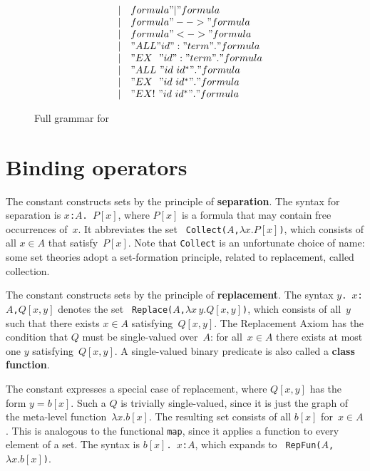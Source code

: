 \begin{figure}
\[\begin{array}{rcl}
         & | & formula " | " formula \\
         & | & formula " --> " formula \\
         & | & formula " <-> " formula \\
         & | & "ALL " id ":" term " . " formula \\
         & | & "EX~~" id ":" term " . " formula \\
         & | & "ALL~" id~id^* " . " formula \\
         & | & "EX~~" id~id^* " . " formula \\
         & | & "EX!~" id~id^* " . " formula
  \end{array}
\]
\caption{Full grammar for {\ZF}} \label{zf-syntax}
\end{figure} 


\section{Binding operators}
The constant  constructs sets by the principle of {\bf
  separation}.  The syntax for separation is
\hbox{\tt\ttlbrace$x$:$A$. $P[x]$\ttrbrace}, where $P[x]$ is a formula
that may contain free occurrences of~$x$.  It abbreviates the set {\tt
  Collect($A$,$\lambda x. P[x]$)}, which consists of all $x\in A$ that
satisfy~$P[x]$.  Note that \texttt{Collect} is an unfortunate choice of
name: some set theories adopt a set-formation principle, related to
replacement, called collection.

The constant  constructs sets by the principle of {\bf
  replacement}.  The syntax
\hbox{\tt\ttlbrace$y$. $x$:$A$,$Q[x,y]$\ttrbrace} denotes the set {\tt
  Replace($A$,$\lambda x\,y. Q[x,y]$)}, which consists of all~$y$ such
that there exists $x\in A$ satisfying~$Q[x,y]$.  The Replacement Axiom
has the condition that $Q$ must be single-valued over~$A$: for
all~$x\in A$ there exists at most one $y$ satisfying~$Q[x,y]$.  A
single-valued binary predicate is also called a {\bf class function}.

The constant  expresses a special case of replacement,
where $Q[x,y]$ has the form $y=b[x]$.  Such a $Q$ is trivially
single-valued, since it is just the graph of the meta-level
function~$\lambda x. b[x]$.  The resulting set consists of all $b[x]$
for~$x\in A$.  This is analogous to the \ML{} functional \texttt{map},
since it applies a function to every element of a set.  The syntax is
\hbox{\tt\ttlbrace$b[x]$. $x$:$A$\ttrbrace}, which expands to {\tt
  RepFun($A$,$\lambda x. b[x]$)}.

